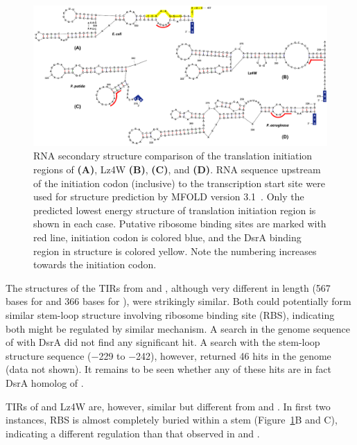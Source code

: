 \begin{figure}
\centering
\includegraphics{figures/chap4_rna_structure}
\caption[RNA secondary structure comparison]{RNA secondary
structure comparison of the translation initiation regions of
 \textbf{(A)}, Lz4W \textbf{(B)}, 
\textbf{(C)}, and  \textbf{(D)}\@. RNA sequence upstream
of the initiation codon (inclusive) to the transcription start
site were used for structure prediction by MFOLD version
3.1~\citep{Mathews1999}. Only the predicted lowest energy
structure of translation initiation region is shown in each case.
Putative ribosome binding sites are marked with red line,
initiation codon is colored blue, and the DsrA binding region in
 structure is colored yellow. Note the numbering
increases towards the initiation codon.} \label{chap4:rna}
\end{figure}

The structures of the TIRs from  and , although
very different in length (567 bases for  and 366 bases
for ), were strikingly similar. Both could potentially
form similar stem-loop structure involving ribosome binding site
(RBS), indicating both might be regulated by  similar mechanism. A
search in the genome sequence of  with  DsrA did
not find any significant hit. A search with the 
stem-loop structure sequence ($-$229 to $-$242), however, returned
46 hits in the genome (data not shown). It remains to be seen
whether any of these hits are in fact DsrA homolog of .

TIRs of  and Lz4W are, however, similar but different
from  and . In first two instances, RBS is
almost completely buried within a stem (Figure~\ref{chap4:rna}B
and C), indicating a different regulation than that observed in
 and .



